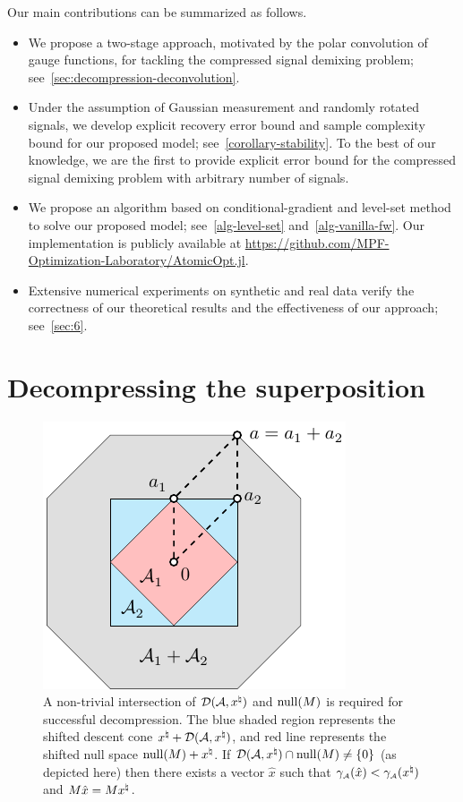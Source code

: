 Our main contributions can be summarized as follows.
\begin{itemize}
  \item We propose a two-stage approach, motivated by the polar convolution of gauge functions, for tackling the compressed signal demixing problem; see~\autoref{sec:decompression-deconvolution}.
  \item Under the assumption of Gaussian measurement and randomly rotated signals, we develop explicit recovery error bound and sample complexity bound for our proposed model; see~\autoref{corollary-stability}. To the best of our knowledge, we are the first to provide explicit error bound for the compressed signal demixing problem with arbitrary number of signals. 
  \item We propose an algorithm based on conditional-gradient and level-set method to solve our proposed model; see~\autoref{alg-level-set} and~\autoref{alg-vanilla-fw}. Our implementation is publicly available at \url{https://github.com/MPF-Optimization-Laboratory/AtomicOpt.jl}. 
  \item Extensive numerical experiments on synthetic and real data verify the correctness of our theoretical results and the effectiveness of our approach; see~\autoref{sec:6}.  
\end{itemize}


\section{Decompressing the superposition}\label{sec:2} 

\begin{figure}[t]
    \centering
   \includegraphics[page=7]{./figures/illustrations2} 
  \caption{A non-trivial intersection of $\mathcal{D}(\mathcal{A}, x^{\natural})$ and $\operatorname{null}(M)$ is required for successful decompression. The blue shaded region represents the shifted descent cone $x^{\natural} + \mathcal{D}(\mathcal{A}, x^{\natural})$, and red line represents the shifted null space $\operatorname{null}(M) + x^{\natural}$. If $\mathcal{D}(\mathcal{A}, x^{\natural}) \cap \operatorname{null}(M) \neq \{0\}$ (as depicted here) then there exists a vector $\hat x$ such that  $\gamma_{\scriptscriptstyle\mathcal{A}}(\hat x) < \gamma_{\scriptscriptstyle\mathcal{A}}(x^{\natural})$ and $M\hat x = Mx^{\natural}$.\label{fig:descent-cone}}
\end{figure}

